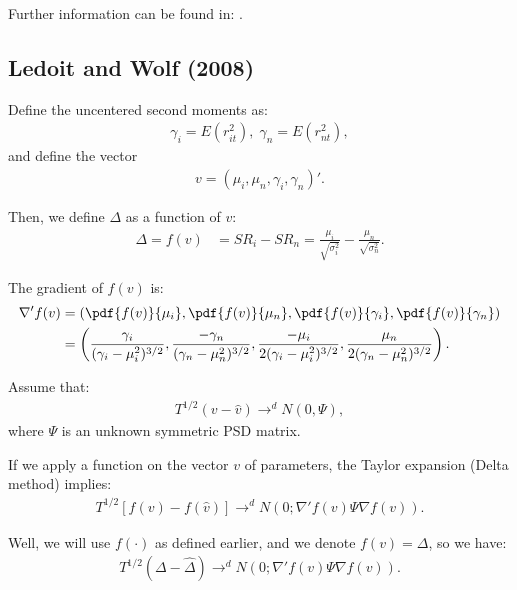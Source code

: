 \documentclass[12pt,oneside,a4paper]{article}
\begin{document}
Further information can be found in: \cite{lo02-sr, jb81-sr}.

\subsection{Ledoit and Wolf (2008)}

Define the uncentered second moments as:
\begin{align*}
	\gamma_{i} = E(r_{it}^{2}), \; \gamma_{n} = E(r_{nt}^{2}),
\end{align*}
and define the vector 
\begin{align*}
v = (\mu_{i}, \mu_{n}, \gamma_{i}, \gamma_{n})'.
\end{align*}

Then, we define $\Delta$ as a function of $v$:
\begin{align}
\Delta = f(v) &= SR_{i} - SR_{n} = 
\frac{\mu_{i}}{\sqrt{\sigma^2_{i}}} - \frac{\mu_{n}}{\sqrt{\sigma^2_{n}}}.
\end{align}

The gradient of $f(v)$ is:
\begin{align*}
\nabla' f(v) &=
\left( 
\pdf{f(v)}{\mu_{i}},
\pdf{f(v)}{\mu_{n}},
\pdf{f(v)}{\gamma_{i}},
\pdf{f(v)}{\gamma_{n}}
\right)
\\ &=
\left( 
\frac{ \gamma_{i}}{(\gamma_{i} - \mu_{i}^2)^{3/2}},
\frac{-\gamma_{n}}{(\gamma_{n} - \mu_{n}^2)^{3/2}}, 
\frac{-\mu_{i}}{2(\gamma_{i} - \mu_{i}^2)^{3/2}},  
\frac{ \mu_{n}}{2(\gamma_{n} - \mu_{n}^2)^{3/2}}
\right).
\end{align*}

Assume that:
\begin{align*}
T^{1/2}(v - \hat{v}) \to^d N(0, \Psi),
\end{align*}
where $\Psi$ is an unknown symmetric PSD matrix.

If we apply a function on the vector $v$ of parameters, the Taylor expansion (Delta method) implies:
\begin{align*}
T^{1/2}[f(v) - f(\hat{v})] \to^d N \left( 0; \nabla'f(v) \Psi \nabla f(v)  \right).
\end{align*}

Well, we will use $f(\cdot)$ as defined earlier, and we denote $f(v) = \Delta$, so we have:
\begin{align*}
T^{1/2}(\Delta - \hat{\Delta}) 	\to^d N \left( 0; \nabla'f(v) \Psi \nabla f(v)  \right).
\end{align*}
\end{document}
